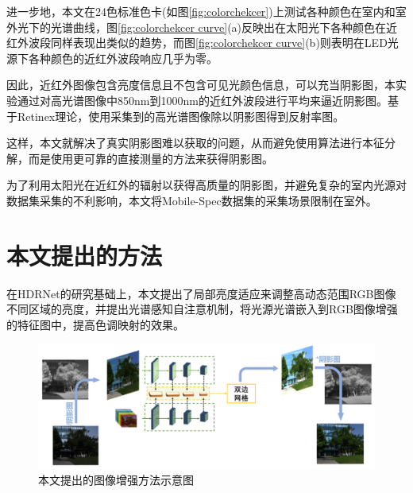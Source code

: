 \documentclass[
    type = master, %
    degree = academic,        %
    decl-page,  %
  ]{njuthesis}
\begin{document}
进一步地，本文在24色标准色卡(如图\ref{fig:colorchekcer})上测试各种颜色在室内和室外光下的光谱曲线，图\ref{fig:colorchekcer curve}(a)反映出在太阳光下各种颜色在近红外波段同样表现出类似的趋势，而图\ref{fig:colorchekcer curve}(b)则表明在LED光源下各种颜色的近红外波段响应几乎为零。

因此，近红外图像包含亮度信息且不包含可见光颜色信息，可以充当阴影图\cite{J7}，本实验通过对高光谱图像中850nm到1000nm的近红外波段进行平均来逼近阴影图。基于Retinex理论\cite{J3,J22}，使用采集到的高光谱图像除以阴影图得到反射率图。

这样，本文就解决了真实阴影图难以获取的问题，从而避免使用算法进行本征分解，而是使用更可靠的直接测量的方法来获得阴影图。

为了利用太阳光在近红外的辐射以获得高质量的阴影图，并避免复杂的室内光源对数据集采集的不利影响，本文将Mobile-Spec数据集的采集场景限制在室外。




\section{本文提出的方法}
在HDRNet\cite{J11}的研究基础上，本文提出了局部亮度适应来调整高动态范围RGB图像不同区域的亮度，并提出光谱感知自注意机制，将光源光谱嵌入到RGB图像增强的特征图中，提高色调映射的效果。


\begin{figure}[h]
	\centering
	\includegraphics[width=1.0\linewidth]{docs/fig-chap3/fig-3-pipeline.pdf}
	\caption{本文提出的图像增强方法示意图}
	\label{fig:enhance pipeline}
\end{figure}
\end{document}
